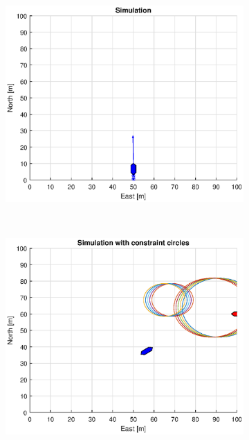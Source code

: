\begin{figure}[!b]
\begin{subfigure}[b]{0.499\textwidth}
        \centering
        \includegraphics[width=\textwidth]{Images/Figures/Enkel_GW/Simple0_f600_Frame2}
    \end{subfigure}
    \hfill
    \\
    \begin{subfigure}[b]{0.49\textwidth}
        \centering
        \includegraphics[width=\textwidth]{Images/Figures/Enkel_GW/Simple0_f1_Frame3}
    \end{subfigure}
    \hfill
    \begin{subfigure}[b]{0.499\textwidth}

\end{subfigure}
\end{figure}

